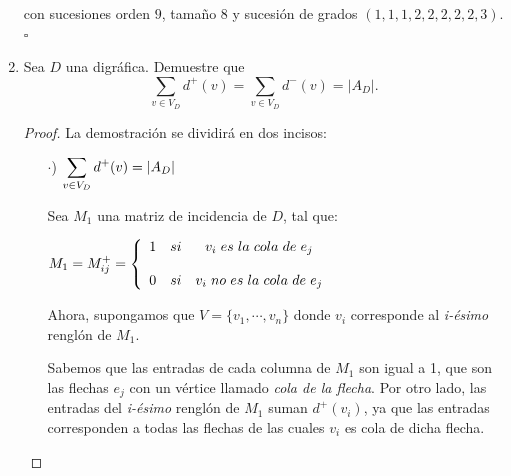 \documentclass{article}
\begin{document}
\begin{enumerate}
\begin{figure}[ht!]
  \end{figure}
  
  con sucesiones orden $9$, tamaño $8$ y sucesión de grados $(1,1,1,2,2,2,2,2,3)$.
  \hfill $\square$
\item Sea $D$ una digr\'afica.   Demuestre que
  $$\sum_{v \in V_D} d^+(v) = \sum_{v \in V_D} d^-(v) = |A_D|.$$
  
  \renewcommand\qedsymbol{QED}
  \begin{proof}
    La demostración se dividirá en dos incisos:  
    \begin{itemize}
    \item[$\cdot$)] $\displaystyle \sum_{v \in V_{D}} d^{+}(v) = \abs{A_{D}}$ 
      
      Sea $M_{1}$ una matriz de incidencia de $D$, tal que:
      \begin{center}
        $M_{1} = M^{+}_{ij}
        = \left \{ 
        \begin{array}{lcc}
          1 &   si  & v_{i} \hspace{0.3em} es \hspace{0.3em} la
          \hspace{0.3em} cola \hspace{0.3em} de \hspace{0.3em} e_{j} \\
          \\0 &  si & v_{i} \hspace{0.3em} no \hspace{0.3em} es \hspace{0.3em}
          la \hspace{0.3em} cola \hspace{0.3em} de \hspace{0.3em} e_{j}
        \end{array}
        \right.$
      \end{center}
      Ahora, supongamos que $V = \{v_{1}, \dotsm, v_{n}\}$ donde $v_{i}$
      corresponde al \textit{i-ésimo} renglón de $M_{1}$.
      
      Sabemos que las entradas de cada columna de $M_{1}$ son igual a 1,
      que son las flechas $e_{j}$ con un vértice llamado \textit{cola de la flecha}.
      Por otro lado, las entradas del \textit{i-ésimo} renglón de $M_{1}$
      suman $d^{+}(v_{i})$, ya que las entradas corresponden a todas las
      flechas de las cuales $v_{i}$ es cola de dicha flecha. 
      

\end{itemize}
\end{proof}
\end{enumerate}
\end{document}
